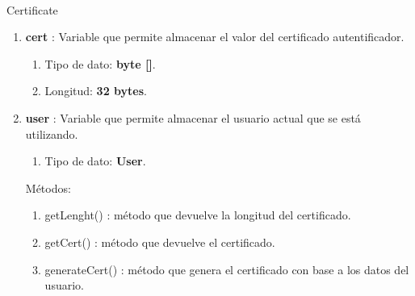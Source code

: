 \documentclass[12pt, a4paper, titlepage]{report}
\begin{document}
		        \paragraph{}
	            \large Certificate
			    \begin{enumerate}
    		        \item \textbf{cert} : Variable que permite almacenar el valor del certificado autentificador.
    		        \begin{enumerate}
    		            \item Tipo de dato: \textbf{byte []}.
    		            \item Longitud: \textbf{32 bytes}.
    		        \end{enumerate}
    		        \item \textbf{user} : Variable que permite almacenar el usuario actual que se está utilizando.
    		        \begin{enumerate}
    		            \item Tipo de dato: \textbf{User}.
    		        \end{enumerate}
    		        
    		        Métodos:
    		        \begin{enumerate}
    		            \item getLenght() : método que devuelve la longitud del certificado.
    		            \item getCert() : método que devuelve el certificado.
    		            \item generateCert() : método que genera el certificado con base a los datos del usuario.
    		        \end{enumerate}
			    \end{enumerate}
			    
\end{document}
